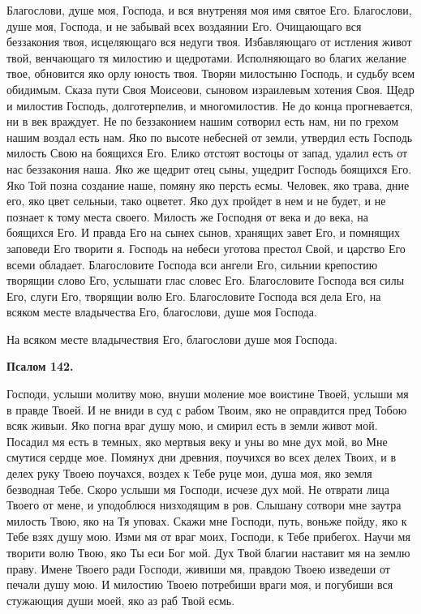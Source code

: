 Благослови, душе моя, Господа, и вся внутреняя моя имя святое Его. Благослови, душе моя, Господа, и не забывай всех воздаянии Его. Очищающаго вся беззакония твоя, исцеляющаго вся недуги твоя. Избавляющаго от истления живот твой, венчающаго тя милостию и щедротами. Исполняющаго во благих желание твое, обновится яко орлу юность твоя. Творяи милостыню Господь, и судьбу всем обидимым. Сказа пути Своя Моисеови, сыновом израилевым хотения Своя. Щедр и милостив Господь, долготерпелив, и многомилостив. Не до конца прогневается, ни в век враждует. Не по беззаконием нашим сотворил есть нам, ни по грехом нашим воздал есть нам. Яко по высоте небесней от земли, утвердил есть Господь милость Свою на боящихся Его. Елико отстоят востоцы от запад, удалил есть от нас беззакония наша. Яко же щедрит отец сыны, ущедрит Господь боящихся Его. Яко Той позна создание наше, помяну яко персть есмы. Человек, яко трава, дние его, яко цвет сельныи, тако оцветет. Яко дух пройдет в нем и не будет, и не познает к тому места своего. Милость же Господня от века и до века, на боящихся Его. И правда Его на сынех сынов, хранящих завет Его, и помнящих заповеди Его творити я. Господь на небеси уготова престол Свой, и царство Его всеми обладает. Благословите Господа вси ангели Его, сильнии крепостию творящии слово Его, услышати глас словес Его. Благословите Господа вся силы Его, слуги Его, творящии волю Его. Благословите Господа вся дела Его, на всяком месте владычества Его, благослови, душе моя Господа.

На всяком месте владычествия Его, благослови душе моя Господа.


\medskip


\bfseries Псалом 142.\normalfont{}


Господи, услыши молитву мою, внуши моление мое воистине Твоей, услыши мя в правде Твоей. И не вниди в суд с рабом Твоим, яко не оправдится пред Тобою всяк живыи. Яко погна враг душу мою, и смирил есть в земли живот мой. Посадил мя есть в темных, яко мертвыя веку и уны во мне дух мой, во Мне смутися сердце мое. Помянух дни древния, поучихся во всех делех Твоих, и в делех руку Твоею поучахся, воздех к Тебе руце мои, душа моя, яко земля безводная Тебе. Скоро услыши мя Господи, исчезе дух мой. Не отврати лица Твоего от мене, и уподоблюся низходящим в ров. Слышану сотвори мне заутра милость Твою, яко на Тя уповах. Скажи мне Господи, путь, воньже пойду, яко к Тебе взях душу мою. Изми мя от враг моих, Господи, к Тебе прибегох. Научи мя творити волю Твою, яко Ты еси Бог мой. Дух Твой благии наставит мя на землю праву. Имене Твоего ради Господи, живиши мя, правдою Твоею изведеши от печали душу мою. И милостию Твоею потребиши враги моя, и погубиши вся стужающия души моей, яко аз раб Твой есмь.

